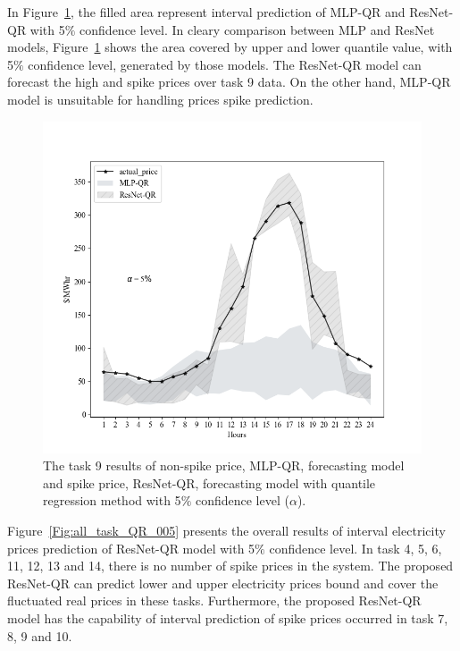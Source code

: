 \documentclass[review]{elsarticle}
\begin{document}
    In Figure~\ref{Fig:compare_spike_and_non_spike_model}, the filled area represent interval prediction of MLP-QR and ResNet-QR with 5$\%$ confidence level.
    In cleary comparison between MLP and ResNet models, Figure~\ref{Fig:compare_spike_and_non_spike_model} shows the area covered by upper and lower quantile value, with 5$\%$ confidence level, generated by those models.
    The ResNet-QR model can forecast the high and spike prices over task 9 data. On the other hand, MLP-QR model is unsuitable for handling prices spike prediction.
    \begin{figure}[H]
      \centering
      \includegraphics[width=12cm]{Task_9-compare_between_non-spike_and_spike}
      \caption{The task 9 results of non-spike price, MLP-QR, forecasting model and spike price, ResNet-QR, forecasting model with quantile regression method with 5$\%$ confidence level ($\alpha$).}
      \label{Fig:compare_spike_and_non_spike_model}
    \end{figure}

    Figure~\ref{Fig:all_task_QR_005} presents the overall results of interval electricity prices prediction of ResNet-QR model with 5$\%$ confidence level.
    In task 4, 5, 6, 11, 12, 13 and 14, there is no number of spike prices in the system.
    The proposed ResNet-QR can predict lower and upper electricity prices bound and cover the fluctuated real prices in these tasks.
    Furthermore, the proposed ResNet-QR model has the capability of interval prediction of spike prices occurred in task 7, 8, 9 and 10.
\end{document}

